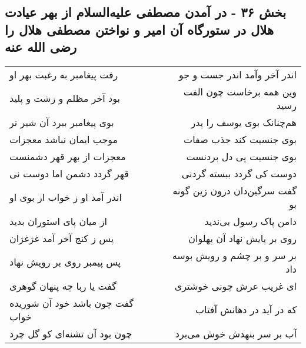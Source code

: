 \begin{center}
\section*{بخش ۳۶ - در آمدن مصطفی علیه‌السلام از بهر عیادت هلال در ستورگاه آن امیر و نواختن مصطفی هلال را رضی الله عنه}
\label{sec:sh036}
\begin{longtable}{l p{0.5cm} r}
رفت پیغامبر به رغبت بهر او
&&
اندر آخر وآمد اندر جست و جو
\\
بود آخر مظلم و زشت و پلید
&&
وین همه برخاست چون الفت رسید
\\
بوی پیغامبر ببرد آن شیر نر
&&
هم‌چنانک بوی یوسف را پدر
\\
موجب ایمان نباشد معجزات
&&
بوی جنسیت کند جذب صفات
\\
معجزات از بهر قهر دشمنست
&&
بوی جنسیت پی دل بردنست
\\
قهر گردد دشمن اما دوست نی
&&
دوست کی گردد ببسته گردنی
\\
اندر آمد او ز خواب از بوی او
&&
گفت سرگین‌دان درون زین گونه بو
\\
از میان پای استوران بدید
&&
دامن پاک رسول بی‌ندید
\\
پس ز کنج آخر آمد غژغژان
&&
روی بر پایش نهاد آن پهلوان
\\
پس پیمبر روی بر رویش نهاد
&&
بر سر و بر چشم و رویش بوسه داد
\\
گفت یا ربا چه پنهان گوهری
&&
ای غریب عرش چونی خوشتری
\\
گفت چون باشد خود آن شوریده خواب
&&
که در آید در دهانش آفتاب
\\
چون بود آن تشنه‌ای کو گل چرد
&&
آب بر سر بنهدش خوش می‌برد
\\
\end{longtable}
\end{center}
